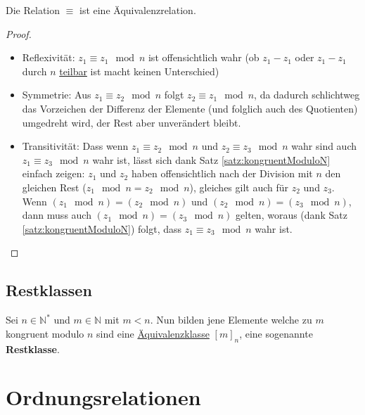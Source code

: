 \documentclass[../../main.tex]{subfiles}
\begin{document}
	\begin{theorem}
		Die Relation $\equiv$ ist eine Äquivalenzrelation.
		\begin{proof}\hspace*{1cm}
			\begin{itemize}
				\item Reflexivität: $z_1 \equiv z_1 \mod n$ ist offensichtlich wahr (ob $z_1-z_1$ oder $z_1-z_1$ durch $n$ \hyperref[def:teilbar]{teilbar} ist macht keinen Unterschied)
				\item Symmetrie: Aus $z_1 \equiv z_2 \mod n$ folgt $z_2 \equiv z_1 \mod n$, da dadurch schlichtweg das Vorzeichen der Differenz der Elemente (und folglich auch des Quotienten) umgedreht wird, der Rest aber unverändert bleibt. 
				\item Transitivität: Dass wenn $z_1 \equiv z_2 \mod n$ und $z_2 \equiv z_3 \mod n$ wahr sind auch $z_1 \equiv z_3 \mod n$ wahr ist, lässt sich dank Satz \ref{satz:kongruentModuloN} einfach zeigen: $z_1$ und $z_2$ haben offensichtlich nach der Division mit $n$ den gleichen Rest ($z_1 \mod n = z_2 \mod n$), gleiches gilt auch für $z_2$ und $z_3$. Wenn $(z_1 \mod n) = (z_2 \mod n)$ und $(z_2 \mod n) = (z_3 \mod n)$, dann muss auch $(z_1 \mod n) = (z_3 \mod n)$ gelten, woraus (dank Satz \ref{satz:kongruentModuloN}) folgt, dass $z_1 \equiv z_3 \mod n$ wahr ist.
			\end{itemize}
		\end{proof}
	\end{theorem}

	\subsection{Restklassen}
	\begin{definition}[Restklasse]
		Sei $n \in \mathbb{N}^*$ und $m \in \mathbb{N}$ mit $m < n$. Nun bilden jene Elemente welche zu $m$ kongruent modulo $n$ sind eine \hyperref[def:Äquivalenzklasse]{Äquivalenzklasse} $[m]_n$, eine sogenannte \textbf{Restklasse}. 
	\end{definition}
	

	\section{Ordnungsrelationen}
\end{document}
